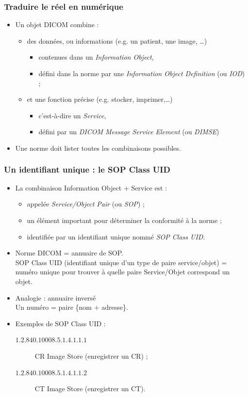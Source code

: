 	\frame
	{
		\frametitle{Traduire le r\'eel en num\'erique}
		
		\begin{itemize}
			\item Un objet DICOM combine :
			\begin{itemize}
				\item des donn\'ees, ou informations (e.g. un patient, une image, \ldots)
				\begin{itemize}
					\item contenues dans un \emph{Information Object},
					\item d\'efini dans la norme par une \emph{Information Object Definition} (ou \emph{IOD}) ;
				\end{itemize}
				
				\item et une fonction pr\'ecise (e.g. stocker, imprimer,\ldots)
				\begin{itemize}
					\item c'est-\`a-dire un \emph{Service},
					\item d\'efini par un \emph{DICOM Message Service Element} (ou \emph{DIMSE})
				\end{itemize}
			\end{itemize}
			\item Une norme doit lister toutes les combinaisons possibles.
		\end{itemize}
	}
	
	\frame
	{
		\frametitle{Un identifiant unique : le SOP Class UID}

		\begin{itemize}
			\item La combinaison Information Object + Service est :
			\begin{itemize}
				\item appel\'ee \emph{Service/Object Pair} (ou \emph{SOP}) ;
				\item un \'el\'ement important pour d\'eterminer la conformit\'e \`a la norme ;
				\item identifi\'ee par un identifiant unique nomm\'e \emph{SOP Class UID}.
			\end{itemize}
			
			\item Norme DICOM = annuaire de SOP.\\
			SOP Class UID (identifiant unique d'un type de paire service/objet) = num\'ero unique pour trouver \`a quelle paire Service/Objet correspond un objet.
			\item Analogie : annuaire invers\'e\\
			Un num\' ero = paire \{nom $+$ adresse\}.
			\item Exemples de SOP Class UID :
			\begin{description}
				\item[$1.2.840.10008.5.1.4.1.1.1$] CR Image Store (enregistrer un CR) ;
				\item[$1.2.840.10008.5.1.4.1.1.2$] CT Image Store (enregistrer un CT).
			\end{description}
		\end{itemize}
	}
	

